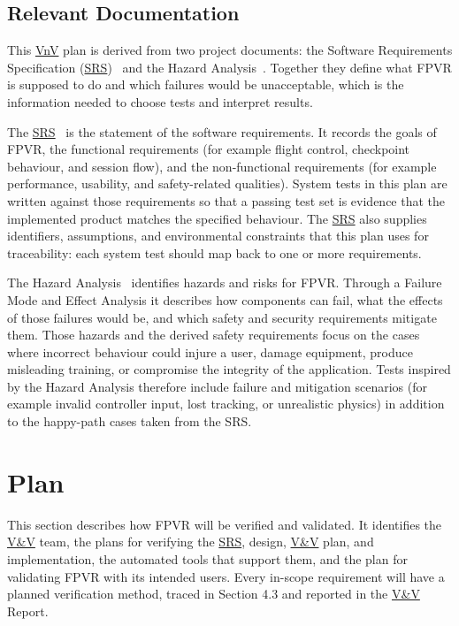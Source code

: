 \documentclass[12pt, titlepage]{article}
\begin{document}
\subsection{Relevant Documentation}

This \hyperlink{abbr:VnV}{VnV} plan is derived from two project documents: the Software
Requirements Specification (\hyperlink{abbr:SRS}{SRS})~\citep{SRS} and the Hazard
Analysis~\citep{HazardAnalysis}. Together they define what FPVR is
supposed to do and which failures would be unacceptable, which is the
information needed to choose tests and interpret results.

The \hyperlink{abbr:SRS}{SRS}~\citep{SRS} is the statement of the software requirements. It
records the goals of FPVR, the functional requirements (for example
flight control, checkpoint behaviour, and session flow), and the
non-functional requirements (for example performance, usability, and
safety-related qualities). System tests in this plan are written
against those requirements so that a passing test set is evidence that
the implemented product matches the specified behaviour. The \hyperlink{abbr:SRS}{SRS} also
supplies identifiers, assumptions, and environmental constraints that
this plan uses for traceability: each system test should map back to
one or more requirements.

The Hazard Analysis~\citep{HazardAnalysis} identifies hazards and
risks for FPVR. Through a Failure Mode and Effect Analysis it
describes how components can fail, what the effects of those failures
would be, and which safety and security requirements mitigate them.
Those hazards and the derived safety requirements focus on the cases where incorrect
behaviour could injure a user, damage equipment, produce misleading
training, or compromise the integrity of the application. Tests
inspired by the Hazard Analysis therefore include failure and
mitigation scenarios (for example invalid controller input, lost
tracking, or unrealistic physics) in addition to the happy-path cases
taken from the SRS.

\section{Plan}

This section describes how FPVR will be verified and validated. It identifies the \hyperlink{abbr:VnV}{V\&V}
team, the plans for verifying the \hyperlink{abbr:SRS}{SRS}, design, \hyperlink{abbr:VnV}{V\&V} plan, and implementation, the
automated tools that support them, and the plan for validating FPVR with its intended
users. Every in-scope requirement will have a planned verification method, traced in
Section 4.3 and reported in the \hyperlink{abbr:VnV}{V\&V} Report.
\end{document}
